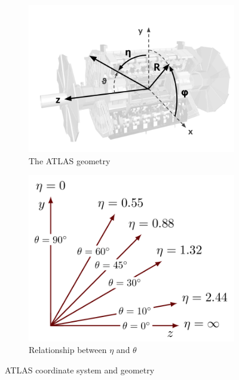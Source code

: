 \begin{figure}
     \centering
     \begin{subfigure}[b]{0.45\textwidth}
         \centering
         \includegraphics[width=\textwidth]{figures/ch3/ATLASgeometry.png}
         \caption{The ATLAS geometry}
         \label{fig:ATLASgeometry}
     \end{subfigure}
     \hfill
     \begin{subfigure}[b]{0.45\textwidth}
         \centering
         \includegraphics[width=\textwidth]{figures/ch3/etaTheta.png}
         \caption{Relationship between $\eta$ and $\theta$}
         \label{fig:etaTheta}
     \end{subfigure}
     \hfill
     \caption {ATLAS coordinate system and geometry}
\end{figure}

